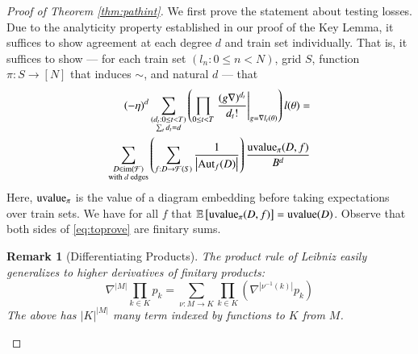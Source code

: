 \documentclass[anon,12pt]{colt2021} %
\newtheorem{rmk}{Remark}
\newcommand{\wrap}[1]{\left(#1\right)}
\newcommand{\wabs}[1]{\left|#1\right|}
\newcommand{\Free}{\mathcal{F}}
\newcommand{\Aut}{\text{\textnormal{Aut}}}
\newcommand{\image}{\text{\textnormal{im}}}
\newcommand{\uvalue}{\text{\textnormal{uvalue}}}
\newcommand{\expct}[1]{\mathbb{E}\left[#1\right]}
\begin{document}
        \begin{proof}[Proof of Theorem \ref{thm:pathint}]
            We first prove the statement about testing losses.
            Due to the analyticity property established in our proof of the
            Key Lemma, it suffices to show agreement at each degree $d$ and
            train set individually.  That is, it suffices to show --- for
            each train set $(l_n: 0\leq n<N)$, grid $S$, function $\pi:
            S\to [N]$ that induces $\sim$, and natural $d$ --- that
            \begin{align} \label{eq:toprove}
                (-\eta)^d
                \sum_{\substack{
                    (d_t: 0\leq t<T) \\
                    \sum_t d_t = d
                }}
                \wrap{
                    \prod_{0 \leq t < T} \left.
                        \frac{(g \nabla)^{d_t}}{d_t!}
                    \right|_{g=\nabla l_t(\theta)}
                } l (\theta)
                = \nonumber \\
                \sum_{\substack{
                    D \in \image(\Free) \\
                    \textnormal{with $d$ edges}
                }}
                \wrap{
                    \sum_{f: D\to\Free(S)}
                    \frac{1}{\wabs{\Aut_f(D)}}
                }
                \frac{\uvalue_\pi(D, f)}{B^{d}}
            \end{align}
            Here, $\uvalue_\pi$ is the value of a diagram embedding before
            taking expectations over train sets.  We have for all $f$ that
            $\expct{\uvalue_\pi(D, f)} = \uvalue(D)$.
            Observe that both sides of \ref{eq:toprove} are finitary sums.

            \begin{rmk}[Differentiating Products] \label{rmk:leibniz}
                The product rule of Leibniz easily generalizes to higher
                derivatives of finitary products:
                $$
                    \nabla^{\wabs{M}} \prod_{k \in K} p_k
                    = 
                    \sum_{\nu:M\to K} \prod_{k\in K} \wrap{
                        \nabla^{\wabs{\nu^{-1}(k)}} p_k
                    }
                $$
                The above has $\wabs{K}^{\wabs{M}}$ many term indexed by
                functions to $K$ from $M$.
            \end{rmk}


\end{proof}
\end{document}
